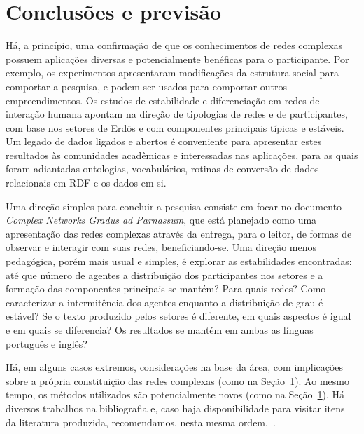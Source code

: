 \documentclass[a4paper,openright,12pt]{report} %
\begin{document}
\chapter{Conclusões e previsão}
Há, a princípio, uma confirmação de que os conhecimentos de redes complexas
possuem aplicações diversas e potencialmente benéficas para o participante.
Por exemplo, os experimentos apresentaram modificações da estrutura social para comportar a pesquisa, e podem ser usados para comportar outros empreendimentos. Os estudos de estabilidade e diferenciação em redes de interação humana apontam na direção de tipologias de redes e de participantes, com base nos setores de Erdös e com componentes principais típicas e estáveis.
Um legado de dados ligados e abertos é conveniente para apresentar estes resultados às comunidades acadêmicas e interessadas nas aplicações, para as quais foram adiantadas ontologias, vocabulários, rotinas de conversão de dados relacionais em RDF e os dados em si.

Uma direção simples para concluir a pesquisa
consiste em focar no documento \emph{Complex Networks Gradus ad Parnassum},
que está planejado como uma apresentação das redes complexas através
da entrega, para o leitor, de formas de observar e interagir com suas redes, beneficiando-se.
Uma direção menos pedagógica, porém mais usual e simples, é
explorar as estabilidades encontradas: até que número de
agentes a distribuição dos participantes nos setores e a
formação das componentes principais se mantém? Para quais redes?
Como caracterizar a intermitência dos agentes enquanto a distribuição de
grau é estável? Se o texto produzido pelos setores é diferente,
em quais aspectos é igual e em quais se diferencia?
Os resultados se mantém em ambas as línguas português e inglês?

Há, em alguns casos extremos, considerações na base da área,
com implicações sobre a própria constituição das redes complexas
(como na Seção~\ref{}).
Ao mesmo tempo, os métodos utilizados são potencialmente novos (como na Seção~\ref{}).
Há diversos trabalhos na bibliografia e,
caso haja disponibilidade para visitar itens da literatura
produzida, recomendamos, nesta mesma ordem,~\cite{timeS,pnud5,ensaioAA,gmane,fourHubs}.


\end{document}
